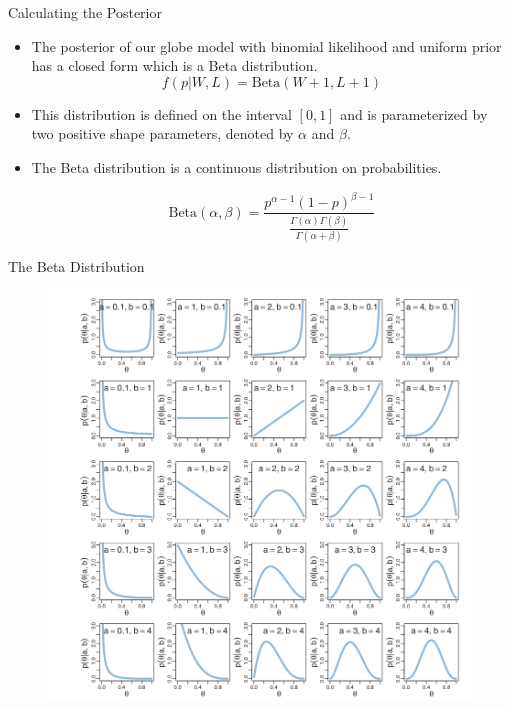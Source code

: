 \documentclass[handout]{beamer}
\begin{document}
\begin{frame}{Calculating the Posterior}
\scriptsize{

\begin{itemize}
\item The posterior of our globe model with binomial likelihood and uniform prior has a closed form which is a Beta distribution.
\begin{displaymath}
f(p|W,L) = \text{Beta}(W+1 , L+1)
\end{displaymath}

\item This distribution is defined on the interval $[0, 1]$ and is parameterized by two positive shape parameters, denoted by $\alpha$ and $\beta$.

\item The Beta distribution is a continuous distribution on probabilities.

\begin{displaymath}
\text{Beta}(\alpha,\beta)=\frac{p^{\alpha-1}(1-p)^{\beta-1}}{\frac{\Gamma(\alpha)\Gamma(\beta)}{\Gamma(\alpha + \beta)}}
\end{displaymath}



\end{itemize}

} 

\end{frame}



\begin{frame}{The Beta Distribution \cite{kruschke2014doing}}
\scriptsize{



\begin{figure}[h!]
	\centering
	\includegraphics[scale=0.24]{pics/Beta(a,b).png}
\end{figure}


} 

\end{frame}
\end{document}

